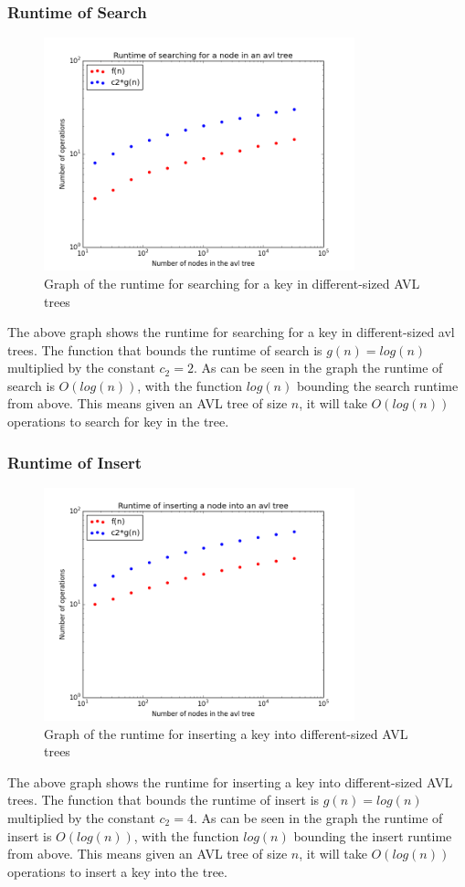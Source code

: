 \documentclass[12pt]{article}
\begin{document}
\subsubsection*{Runtime of Search}
\begin{figure}[h]
\caption{Graph of the runtime for searching for a key in different-sized AVL
trees}
\includegraphics[width=9cm]{search_runtime.png}
\centering
\end{figure}
\noindent
The above graph shows the runtime for searching for a key in different-sized
avl trees.
The function that bounds the runtime of search is $g(n)=log(n)$ multiplied by
the constant $c_2=2$.
As can be seen in the graph the
runtime of search is $O(log(n))$, with the function $log(n)$ bounding the
search runtime from above.  This means given an AVL tree of size $n$, it will
take $O(log(n))$ operations to search for key in the tree.

\subsubsection*{Runtime of Insert}
\begin{figure}[h]
\caption{Graph of the runtime for inserting a key into different-sized AVL
trees}
\includegraphics[width=9cm]{insert_runtime.png}
\centering
\end{figure}
\noindent
The above graph shows the runtime for inserting a key into different-sized AVL
trees.  The function that bounds the runtime of insert is $g(n)=log(n)$
multiplied by the constant $c_2=4$.  As can be seen in the graph the runtime of
insert is $O(log(n))$, with the function $log(n)$ bounding the insert runtime
from above.  This means given an AVL tree of size $n$, it will take $O(log(n))$
operations to insert a key into the tree.
\end{document}
